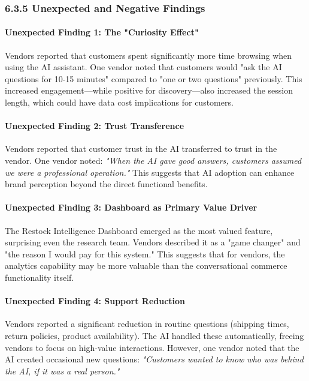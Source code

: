 \documentclass[12pt,a4paper]{article}
\begin{document}
\subsubsection{6.3.5 Unexpected and Negative Findings}

\paragraph{Unexpected Finding 1: The "Curiosity Effect"}

Vendors reported that customers spent significantly more time browsing when using the AI assistant. One vendor noted that customers would "ask the AI questions for 10-15 minutes" compared to "one or two questions" previously. This increased engagement---while positive for discovery---also increased the session length, which could have data cost implications for customers.

\paragraph{Unexpected Finding 2: Trust Transference}

Vendors reported that customer trust in the AI transferred to trust in the vendor. One vendor noted: \textit{"When the AI gave good answers, customers assumed we were a professional operation."} This suggests that AI adoption can enhance brand perception beyond the direct functional benefits.

\paragraph{Unexpected Finding 3: Dashboard as Primary Value Driver}

The Restock Intelligence Dashboard emerged as the most valued feature, surprising even the research team. Vendors described it as a "game changer" and "the reason I would pay for this system." This suggests that for vendors, the analytics capability may be more valuable than the conversational commerce functionality itself.

\paragraph{Unexpected Finding 4: Support Reduction}

Vendors reported a significant reduction in routine questions (shipping times, return policies, product availability). The AI handled these automatically, freeing vendors to focus on high-value interactions. However, one vendor noted that the AI created occasional new questions: \textit{"Customers wanted to know who was behind the AI, if it was a real person."}
\end{document}
